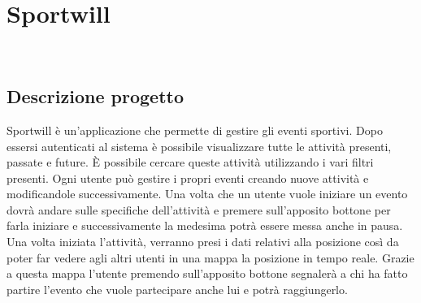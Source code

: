 
\chapter{Sportwill}
\label{cap:Sportwill}

\\


\section{Descrizione progetto}
Sportwill è un'applicazione che permette di gestire gli eventi sportivi. Dopo essersi autenticati al sistema è possibile visualizzare tutte le attività presenti, passate e future. È possibile cercare queste attività utilizzando i vari filtri presenti. Ogni utente può gestire i propri eventi creando nuove attività e modificandole successivamente. Una volta che un utente vuole iniziare un evento dovrà andare sulle specifiche dell'attività e premere sull'apposito bottone per farla iniziare e successivamente la medesima potrà essere messa anche in pausa. Una volta iniziata l'attività, verranno presi i dati relativi alla posizione così da poter far vedere agli altri utenti in una mappa la posizione in tempo reale. Grazie a questa mappa l'utente premendo sull'apposito bottone segnalerà a chi ha fatto partire l'evento che vuole partecipare anche lui e potrà raggiungerlo.

\newpage

